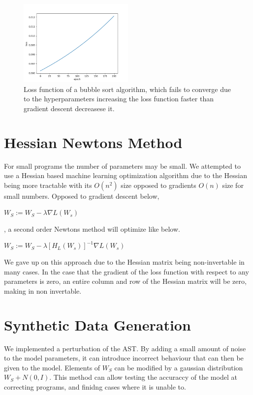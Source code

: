 \documentclass{article}
\begin{document}
\begin{figure}[h!]
  \begin{center}
    \includegraphics[width=0.5\textwidth]{bubble_sort.png}
  \end{center}
  \caption{Loss function of a bubble sort algorithm, which fails to converge due to the hyperparameters increasing the loss function faster than gradient descent decreasese it.}
  \label{fig:bubble_sort}
\end{figure}
\section{Hessian Newtons Method}
For small programs the number of parameters may be small. We attempted to use a Hessian based machine learning optimization algorithm due to the Hessian being more tractable with its $O(n^2)$ size opposed to gradients $O(n)$ size for small numbers. Opposed to gradient descent below,

\begin{center}
  $W_S := W_S - \lambda \nabla L(W_s)$
\end{center}

, a second order Newtons method will optimize like below.
\begin{center}
  $W_S := W_S - \lambda [H_L(W_s)]^{-1} \nabla L(W_s)$
\end{center}

We gave up on this approach due to the Hessian matrix being non-invertable in many cases. In the case that the gradient of the loss function with respect to any parameters is zero, an entire column and row of the Hessian matrix will be zero, making in non invertable.

\section{Synthetic Data Generation}
We implemented a perturbation of the AST. By adding a small amount of noise to the model parameters, it can introduce incorrect behaviour that can then be given to the model. Elements of $W_S$ can be modified by a gaussian distribution $W_S + N(0, I)$. This method can allow testing the accuraccy of the model at correcting programs, and finidng cases where it is unable to.
\end{document}
